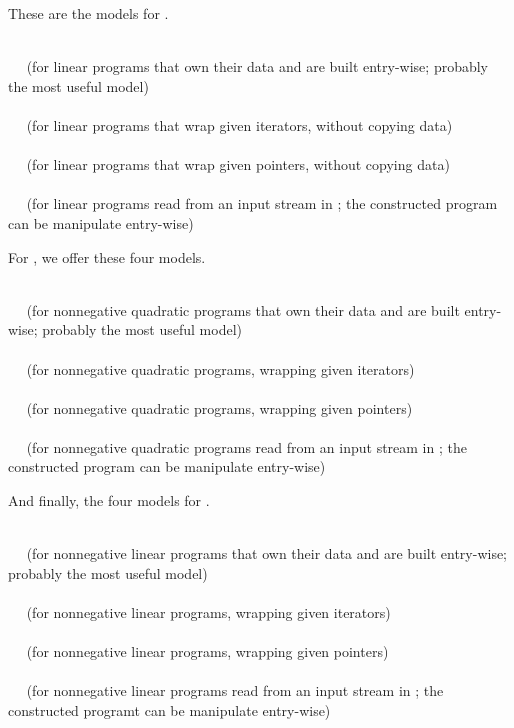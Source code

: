 These are the models for .

\\
$\quad$ (for linear programs that own their data and are built entry-wise; probably the most useful model)\\
\\
$\quad$ (for linear programs that wrap given iterators, without copying 
data) \\
\\
$\quad$ (for linear programs that wrap given pointers, without copying 
data) \\
\\ 
$\quad$ (for linear programs read from an input stream in 
; the constructed program can be manipulate entry-wise)

For , we offer these
four models.

\\
$\quad$ (for nonnegative quadratic programs that own their data and are built entry-wise; probably the most useful model)\\
\\
$\quad$ (for nonnegative quadratic programs, wrapping given iterators)\\
\\
$\quad$ (for nonnegative quadratic programs, wrapping given pointers)\\
\\
$\quad$ (for nonnegative quadratic programs read from an input stream in 
; the constructed program can be manipulate entry-wise)

And finally, the four models for .

\\
$\quad$ (for nonnegative linear programs that own their data and are built entry-wise; probably the most useful model)\\
\\
$\quad$ (for nonnegative linear programs, wrapping given iterators)\\
\\
$\quad$ (for nonnegative linear programs, wrapping given pointers)\\
\\
$\quad$ (for nonnegative linear programs read from an input stream in 
; the constructed programt can be manipulate entry-wise)

